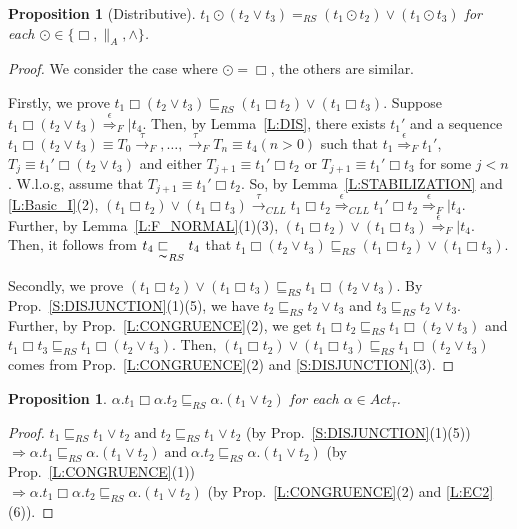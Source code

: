 \documentclass{elsarticle}
\theoremstyle{plain}
\newtheorem{proposition}[theorem]{Proposition}
\theoremstyle{definition}
\begin{document}
\begin{proposition}[Distributive]\label{S:DISTRIBUTIVE}
       $t_1 \odot( t_2 \vee t_3) =_{RS} (t_1 \odot t_2) \vee (t_1 \odot t_3)$ for each  $\odot \in \{ \Box, \parallel_A,\wedge \}$.
\end{proposition}
\begin{proof}
    We consider the case where $\odot = \Box$, the others are similar.

    Firstly, we prove $t_1 \Box( t_2 \vee t_3) \sqsubseteq_{RS} (t_1 \Box t_2) \vee (t_1 \Box t_3)$.
    Suppose $t_1 \Box( t_2 \vee t_3) \stackrel{\epsilon}{\Longrightarrow}_F| t_4$.
    Then, by Lemma~\ref{L:DIS}, there exists $t_1'$ and a sequence $t_1 \Box ( t_2 \vee t_3) \equiv T_0 \stackrel{\tau}{\longrightarrow}_F,\dots,\stackrel{\tau}{\longrightarrow}_F T_n  \equiv t_4(n > 0)$ such that $t_1\stackrel{\epsilon}{\Longrightarrow}_F t_1'$, $T_j\equiv t_1' \Box( t_2 \vee t_3)$ and either $T_{j+1}\equiv t_1' \Box t_2 $ or $T_{j+1}\equiv t_1' \Box  t_3$ for some $j<n$.
    W.l.o.g, assume that $T_{j+1}\equiv t_1' \Box t_2$.
    So, by Lemma~\ref{L:STABILIZATION} and \ref{L:Basic_I}(2), $(t_1 \Box t_2) \vee (t_1 \Box t_3) \stackrel{\tau}{\longrightarrow}_{{CLL}} t_1 \Box t_2 \stackrel{\epsilon}{\Longrightarrow}_{{CLL}} t_1' \Box t_2 \stackrel{\epsilon}{\Longrightarrow}_F| t_4$.
    Further, by Lemma~\ref{L:F_NORMAL}(1)(3), $(t_1 \Box t_2) \vee (t_1 \Box t_3) \stackrel{\epsilon}{\Longrightarrow}_F| t_4$.
    Then, it follows from $t_4\underset{\thicksim}{\sqsubset}_{RS} t_4$ that $t_1 \Box( t_2 \vee t_3) \sqsubseteq_{RS} (t_1 \Box t_2) \vee (t_1 \Box t_3)$.

    Secondly, we prove $(t_1 \Box t_2) \vee (t_1 \Box t_3) \sqsubseteq_{RS} t_1 \Box(t_2 \vee t_3)$.
    By Prop.~\ref{S:DISJUNCTION}(1)(5), we have  $t_2 \sqsubseteq_{RS} t_2 \vee t_3$ and $t_3 \sqsubseteq_{RS} t_2 \vee t_3$.
    Further, by Prop.~\ref{L:CONGRUENCE}(2), we get $t_1 \Box t_2 \sqsubseteq_{RS} t_1 \Box (t_2 \vee t_3)$ and $t_1 \Box t_3 \sqsubseteq_{RS} t_1 \Box (t_2 \vee t_3)$. Then, $(t_1 \Box t_2 )\vee (t_1 \Box t_3) \sqsubseteq_{RS} t_1 \Box (t_2 \vee t_3)$ comes from Prop.~\ref{L:CONGRUENCE}(2) and \ref{S:DISJUNCTION}(3).
\end{proof}


\begin{proposition}\label{S:SPECIAL_I}
$\alpha.t_1 \Box \alpha.t_2 \sqsubseteq_{RS} \alpha.(t_1 \vee t_2) $ for each $\alpha \in Act_{\tau}$.
\end{proposition}
\begin{proof}
   $ t_1 \sqsubseteq_{RS} t_1 \vee t_2\;\text{and}\;t_2 \sqsubseteq_{RS} t_1 \vee t_2$  \qquad \;\;\;\; (by Prop.~\ref{S:DISJUNCTION}(1)(5))\\
 $\Rightarrow \alpha.t_1 \sqsubseteq_{RS} \alpha.(t_1 \vee t_2)\;\text{and}\;\alpha.t_2 \sqsubseteq_{RS} \alpha.(t_1 \vee t_2)$  (by Prop.~\ref{L:CONGRUENCE}(1))\\
 $\Rightarrow \alpha.t_1 \Box \alpha.t_2 \sqsubseteq_{RS} \alpha.(t_1 \vee t_2)$ \qquad \qquad \qquad \qquad(by Prop.~\ref{L:CONGRUENCE}(2) and \ref{L:EC2}(6)).
\end{proof}
\end{document}
